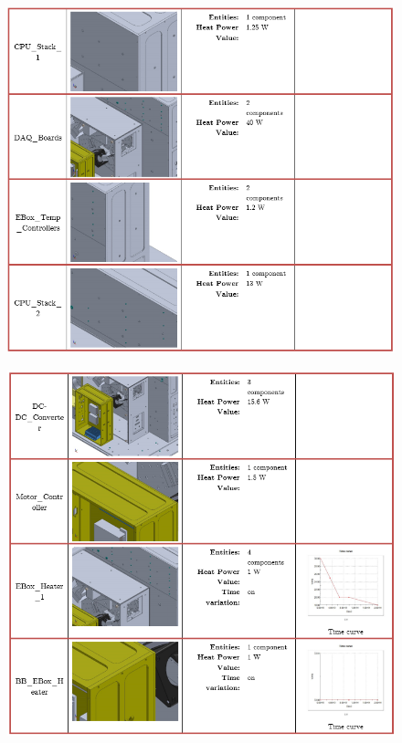 \begin{figure}
    \centering
    \includegraphics[width=\textwidth]{thermal_load_images/float_TL_images/float_3.PNG}
\end{figure}

\begin{figure}
    \centering
    \includegraphics[width=\textwidth]{thermal_load_images/float_TL_images/float_4.PNG}
\end{figure}

